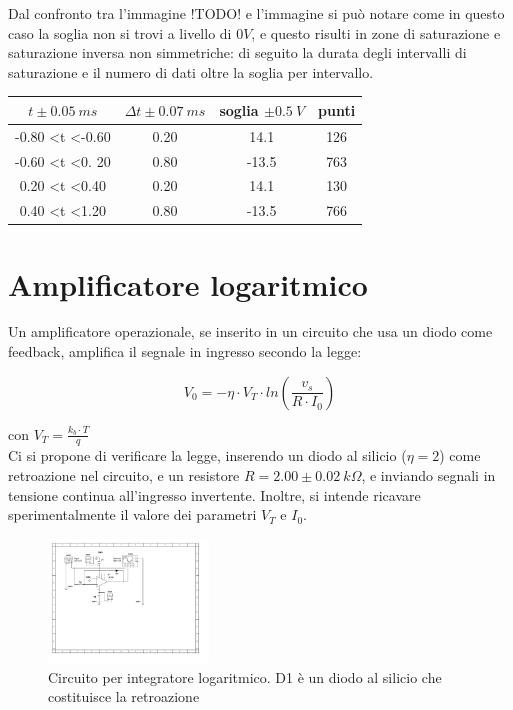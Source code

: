 \documentclass[journal]{IEEEtran}
\begin{document}
Dal confronto tra l'immagine !TODO! e l'immagine si può notare come in questo caso la soglia non si trovi a livello di $0 V$, e questo risulti in zone di saturazione e
saturazione inversa non simmetriche: di seguito la durata degli intervalli di saturazione e il numero di dati oltre la soglia per intervallo.

\begin{tabular}{|c|c|c|c|}
\hline
$t  \pm 0.05 \ ms$ & $\Delta t \pm 0.07 \ ms$ & soglia $\pm 0.5 \ V$ & punti \\ \hline
-0.80 \textless t \textless -0.60 & 0.20 & 14.1  & 126 \\ \hline
-0.60 \textless t \textless 0. 20 & 0.80 & -13.5 & 763 \\ \hline
0.20 \textless t \textless 0.40   & 0.20 & 14.1  & 130 \\ \hline
0.40 \textless t \textless 1.20   & 0.80 & -13.5 & 766 \\ \hline
\end{tabular}



\section{Amplificatore logaritmico} %

Un amplificatore operazionale, se inserito in un circuito che usa un diodo come feedback, amplifica il segnale in ingresso secondo la legge:

\begin{equation}
V_0 = - \eta \cdot V_T \cdot ln( \frac{v_s}{R \cdot I_0} )
\end{equation}

con $V_T = \frac{k_{b} \cdot T}{q}$ \\

Ci si propone di verificare la legge, inserendo un diodo al silicio ($\eta = 2$) come retroazione nel circuito, e un resistore $R = 2.00 \pm 0.02 \ k\Omega$, e inviando segnali in tensione continua all'ingresso invertente. Inoltre, si intende ricavare sperimentalmente il valore dei parametri $V_T$ e $I_0$.

\begin{figure}[H]%
\begin {center}
\includegraphics[width=0.38\textwidth]{sch-simulations/output/OPA-log.pdf}
\caption{Circuito per integratore logaritmico. D1 è un diodo al silicio che costituisce la retroazione}
\label{fig:oscilloscope}
\end {center}
\end{figure}
\end{document}
